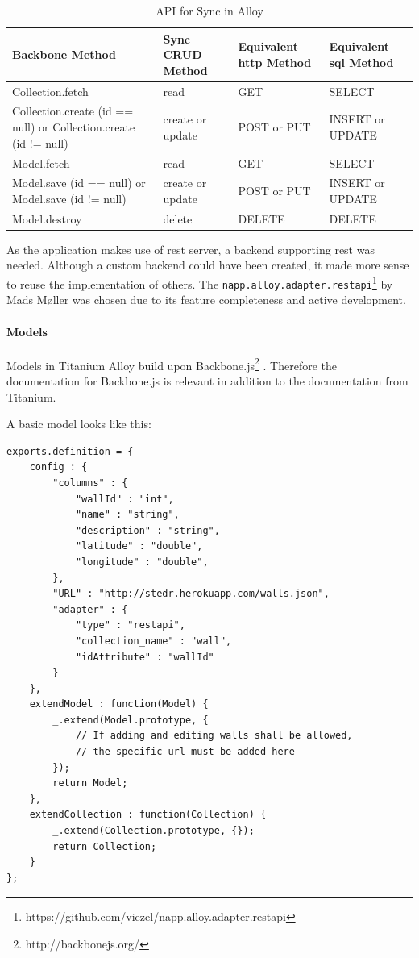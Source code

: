 \documentclass[11pt]{book}
\begin{document}
\begin{table}[H]
    \centering
    \begin{tabular}{| p{3.5cm} | p{3.5cm} | p{3.5cm} | p{2.5cm} |}
        \hline
        Backbone Method & Sync CRUD Method & Equivalent \gls{http} Method & Equivalent \gls{sql} Method\\
        \hline
        Collection.fetch & read & GET & SELECT\\
        \hline
        Collection.create (id == null) or Collection.create (id != null) & create or update & POST or PUT & INSERT or UPDATE\\
        \hline
        Model.fetch & read    & GET & SELECT\\
        \hline
        Model.save (id == null) or Model.save (id != null) & create or update & POST or PUT & INSERT or UPDATE\\
        \hline
        Model.destroy & delete & DELETE & DELETE\\
        \hline
    \end{tabular}
    \caption{API for Sync in Alloy\cite{titaniumAlloySync}}
    \label{tab:phase_sprint2_model}
\end{table}

As the application makes use of \gls{rest} server, a backend supporting \gls{rest} was needed. Although a custom backend could have been created, it made more sense to reuse the implementation of others. The \texttt{napp.alloy.adapter.restapi}\footnote{https://github.com/viezel/napp.alloy.adapter.restapi} by Mads Møller was chosen due to its feature completeness and active development.

\paragraph{Models}
Models in Titanium Alloy build upon Backbone.js\footnote{http://backbonejs.org/} \cite{titaniumAlloyModel}. Therefore the documentation for Backbone.js is relevant in addition to the documentation from Titanium.

A basic model looks like this:
\begin{lstlisting}[frame=single]
exports.definition = {
    config : {
        "columns" : {
            "wallId" : "int",
            "name" : "string",
            "description" : "string",
            "latitude" : "double",
            "longitude" : "double",
        },
        "URL" : "http://stedr.herokuapp.com/walls.json",
        "adapter" : {
            "type" : "restapi",
            "collection_name" : "wall",
            "idAttribute" : "wallId"
        }
    },
    extendModel : function(Model) {
        _.extend(Model.prototype, {
            // If adding and editing walls shall be allowed,
            // the specific url must be added here
        });
        return Model;
    },
    extendCollection : function(Collection) {
        _.extend(Collection.prototype, {});
        return Collection;
    }
};
\end{lstlisting}
\end{document}
